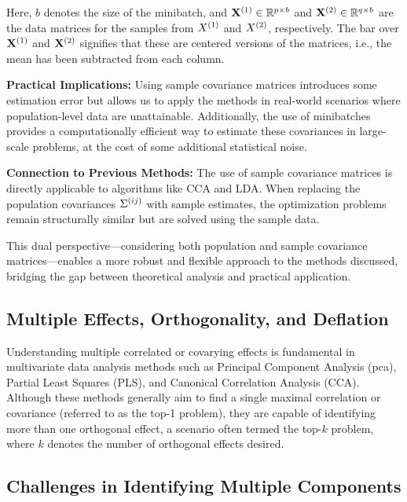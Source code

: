 Here, \(b\) denotes the size of the minibatch, and \(\mathbf{X}^{(1)} \in \mathbb{R}^{p \times b}\) and \(\mathbf{X}^{(2)} \in \mathbb{R}^{q \times b}\) are the data matrices for the samples from \(X^{(1)}\) and \(X^{(2)}\), respectively. The bar over \(\mathbf{X}^{(1)}\) and \(\mathbf{X}^{(2)}\) signifies that these are centered versions of the matrices, i.e., the mean has been subtracted from each column.

\textbf{Practical Implications:} Using sample covariance matrices introduces some estimation error but allows us to apply the methods in real-world scenarios where population-level data are unattainable. Additionally, the use of minibatches provides a computationally efficient way to estimate these covariances in large-scale problems, at the cost of some additional statistical noise.

\textbf{Connection to Previous Methods:} The use of sample covariance matrices is directly applicable to algorithms like CCA and LDA. When replacing the population covariances \(\Sigma^{(ij)}\) with sample estimates, the optimization problems remain structurally similar but are solved using the sample data.

This dual perspective—considering both population and sample covariance matrices—enables a more robust and flexible approach to the methods discussed, bridging the gap between theoretical analysis and practical application.

\subsection{Multiple Effects, Orthogonality, and Deflation}\label{subsec:orthogonality}

Understanding multiple correlated or covarying effects is fundamental in multivariate data analysis methods such as Principal Component Analysis (\acrshort{pca}), Partial Least Squares (PLS), and Canonical Correlation Analysis (CCA). Although these methods generally aim to find a single maximal correlation or covariance (referred to as the top-1 problem), they are capable of identifying more than one orthogonal effect, a scenario often termed the top-$k$ problem, where $k$ denotes the number of orthogonal effects desired.

\subsection{Challenges in Identifying Multiple Components}


